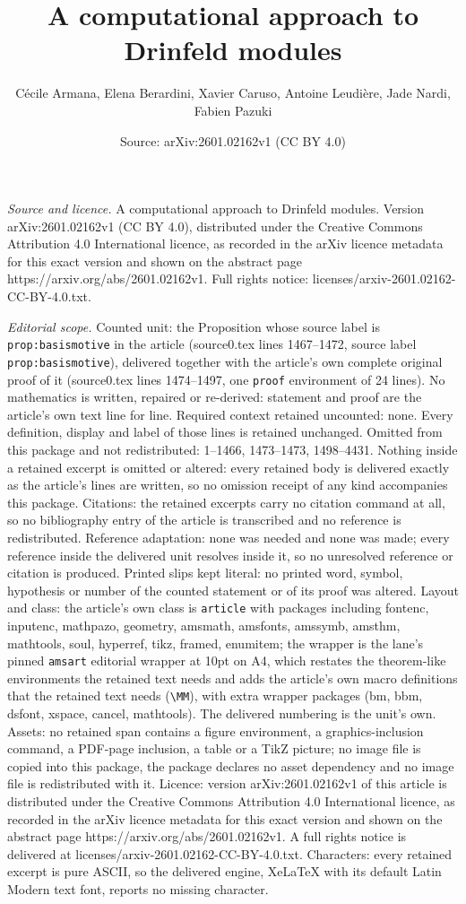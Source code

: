\documentclass[10pt,a4paper]{amsart}
\title[A computational approach to Drinfeld modules]{A computational approach to Drinfeld modules}
\author{C\'ecile Armana, Elena Berardini, Xavier Caruso, Antoine Leudi\`ere, Jade Nardi, Fabien Pazuki}
\date{Source: arXiv:2601.02162v1 (CC BY 4.0)}
\begin{document}
\maketitle

\noindent\emph{Source and licence.} A computational approach to Drinfeld modules. Version arXiv:2601.02162v1 (CC BY 4.0), distributed under the Creative Commons Attribution 4.0 International licence, as recorded in the arXiv licence metadata for this exact version and shown on the abstract page https://arxiv.org/abs/2601.02162v1. Full rights notice: licenses/arxiv-2601.02162-CC-BY-4.0.txt.\par\smallskip

\noindent\textit{Editorial scope.} Counted unit: the Proposition whose source label is \texttt{prop:basismotive} in the article (source0.tex lines 1467--1472, source label \texttt{prop:basismotive}), delivered together with the article's own complete original proof of it (source0.tex lines 1474--1497, one \texttt{proof} environment of 24 lines). No mathematics is written, repaired or re-derived: statement and proof are the article's own text line for line. Required context retained uncounted: none. Every definition, display and label of those lines is retained unchanged. Omitted from this package and not redistributed: 1--1466, 1473--1473, 1498--4431. Nothing inside a retained excerpt is omitted or altered: every retained body is delivered exactly as the article's lines are written, so no omission receipt of any kind accompanies this package. Citations: the retained excerpts carry no citation command at all, so no bibliography entry of the article is transcribed and no reference is redistributed. Reference adaptation: none was needed and none was made; every reference inside the delivered unit resolves inside it, so no unresolved reference or citation is produced. Printed slips kept literal: no printed word, symbol, hypothesis or number of the counted statement or of its proof was altered. Layout and class: the article's own class is \texttt{article} with packages including fontenc, inputenc, mathpazo, geometry, amsmath, amsfonts, amssymb, amsthm, mathtools, soul, hyperref, tikz, framed, enumitem; the wrapper is the lane's pinned \texttt{amsart} editorial wrapper at 10pt on A4, which restates the theorem-like environments the retained text needs and adds the article's own macro definitions that the retained text needs (\texttt{\textbackslash MM}), with extra wrapper packages (bm, bbm, dsfont, xspace, cancel, mathtools). The delivered numbering is the unit's own. Assets: no retained span contains a figure environment, a graphics-inclusion command, a PDF-page inclusion, a table or a TikZ picture; no image file is copied into this package, the package declares no asset dependency and no image file is redistributed with it. Licence: version arXiv:2601.02162v1 of this article is distributed under the Creative Commons Attribution 4.0 International licence, as recorded in the arXiv licence metadata for this exact version and shown on the abstract page https://arxiv.org/abs/2601.02162v1. A full rights notice is delivered at licenses/arxiv-2601.02162-CC-BY-4.0.txt. Characters: every retained excerpt is pure ASCII, so the delivered engine, XeLaTeX with its default Latin Modern text font, reports no missing character.
\end{document}
